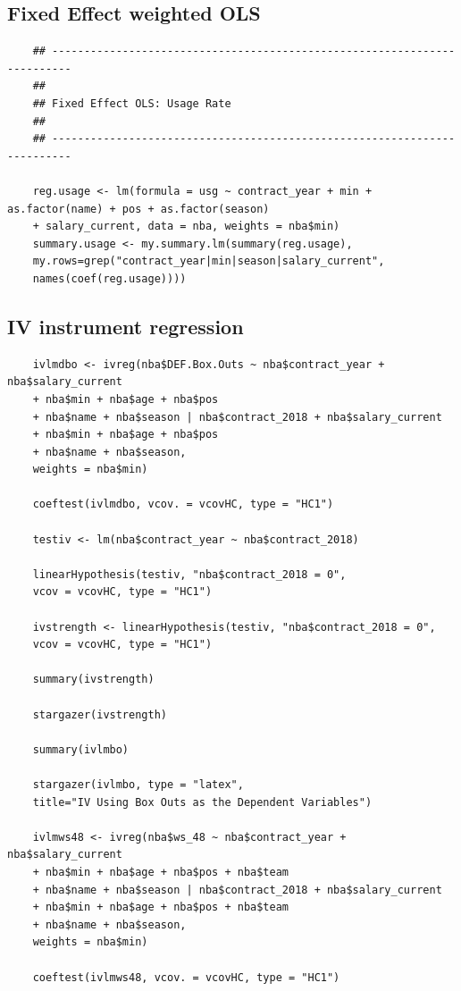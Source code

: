 \documentclass[12pt]{article}
\begin{document}
	\subsection{Fixed Effect weighted OLS}
	
	\begin{lstlisting}
	## -------------------------------------------------------------------------
	##
	## Fixed Effect OLS: Usage Rate
	##
	## -------------------------------------------------------------------------
	
	reg.usage <- lm(formula = usg ~ contract_year + min + as.factor(name) + pos + as.factor(season) 
	+ salary_current, data = nba, weights = nba$min)
	summary.usage <- my.summary.lm(summary(reg.usage), 
	my.rows=grep("contract_year|min|season|salary_current",
	names(coef(reg.usage))))
	\end{lstlisting}
	
	\subsection{IV instrument regression}
	
	\begin{lstlisting}
	ivlmdbo <- ivreg(nba$DEF.Box.Outs ~ nba$contract_year + nba$salary_current
	+ nba$min + nba$age + nba$pos
	+ nba$name + nba$season | nba$contract_2018 + nba$salary_current
	+ nba$min + nba$age + nba$pos
	+ nba$name + nba$season,
	weights = nba$min)
	
	coeftest(ivlmdbo, vcov. = vcovHC, type = "HC1")
	
	testiv <- lm(nba$contract_year ~ nba$contract_2018)
	
	linearHypothesis(testiv, "nba$contract_2018 = 0", 
	vcov = vcovHC, type = "HC1")
	
	ivstrength <- linearHypothesis(testiv, "nba$contract_2018 = 0", 
	vcov = vcovHC, type = "HC1")
	
	summary(ivstrength)
	
	stargazer(ivstrength)
	
	summary(ivlmbo)
	
	stargazer(ivlmbo, type = "latex",
	title="IV Using Box Outs as the Dependent Variables")
	
	ivlmws48 <- ivreg(nba$ws_48 ~ nba$contract_year + nba$salary_current
	+ nba$min + nba$age + nba$pos + nba$team
	+ nba$name + nba$season | nba$contract_2018 + nba$salary_current
	+ nba$min + nba$age + nba$pos + nba$team
	+ nba$name + nba$season,
	weights = nba$min)
	
	coeftest(ivlmws48, vcov. = vcovHC, type = "HC1")
	\end{lstlisting}
	
\end{document}
